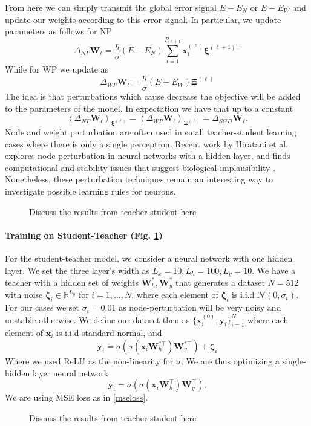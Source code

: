 \documentclass{article}
\def\R{\mathbb{R}}
\def\*#1{\mathbf{#1}}
\begin{document}
From here we can simply transmit the global error signal $E-E_N$ or $E-E_W$ and update our weights according
to this error signal. In particular, we update parameters as follows for NP
\[ \Delta_{NP} \*W_{\ell} =\frac{\eta}{\sigma} (E-E_N) \sum_{i=1}^{R_{\ell+1}} \*x^{(\ell)}_i \* \xi^{(\ell+1)\top} \]
While for WP we update as
\[ \Delta_{WP} \*W_{\ell} = \frac{\eta}{\sigma} (E-E_W) \* \Xi^{(\ell)} \]
 The idea is that perturbations which cause decrease the objective will be added to 
 the parameters of the model. In expectation we have that up to a constant
\[ \left\langle \Delta_{NP}\*W_{\ell} \right\rangle_{\*\xi^{(\ell)}}= \left\langle \Delta_{WP}\*W_{\ell} \right\rangle_{\*\Xi^{(\ell)}} =  \Delta_{SGD}\*W_{\ell}.\]
Node and weight perturbation are often used in small teacher-student learning cases 
where there is only a single perceptron. Recent work by Hiratani et al. explores node perturbation
in neural networks with a hidden layer, and finds computational and stability issues that
suggest biological implausibility \cite{hiratani2022on}. Nonetheless, these perturbation techniques remain an interesting way
to investigate possible learning rules for neurons. 

\begin{figure}
  \centering
  \fbox{\rule[-.5cm]{0cm}{4cm} \rule[-.5cm]{4cm}{0cm}}
  \caption{Discuss the results from teacher-student here  \label{fig:teachstudent}}
\end{figure}



\paragraph{Training on Student-Teacher (Fig. \ref{fig:teachstudent})} For the student-teacher model, we consider a neural network with one hidden layer. We set the three layer's width as $L_x = 10, L_h = 100, L_y = 10$. We have a teacher with a hidden set of weights $\*W^*_h, \*W^*_y$ that generates a dataset $N=512$ with noise $\*\zeta_i \in \R^{L_y}$ for $i=1,\ldots, N$, where each element of $\*\zeta_i$ is i.i.d $\mathcal{N}(0, \sigma_t)$. For our cases we set $\sigma_t = 0.01$ as node-perturbation will be very noisy and unstable otherwise. We define our dataset then as $\{\*x_i^{(0)},\*y_i\}_{i=1}^N$ where each element of $\*x_i$ is i.i.d standard normal, and 
\[ \*y_i = \sigma\left(\sigma(\*x_i \*W^{*\top}_h)\*W_y^{*\top}\right) + \*\zeta_i \]
Where we used ReLU as the non-linearity for $\sigma$. We are thus optimizing a single-hidden layer neural network 
\[ \hat{\*y}_i =  \sigma\left(\sigma(\*x_i \*W^{\top}_h)\*W_y^{\top}\right).\]
We are using MSE loss as in \ref{mseloss}.
\begin{figure}
  \centering
  \fbox{\rule[-.5cm]{0cm}{4cm} \rule[-.5cm]{4cm}{0cm}}
  \caption{Discuss the results from teacher-student here  \label{fig:mnist}}
\end{figure}
\end{document}
